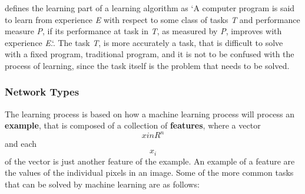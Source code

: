 \documentclass{article}
\begin{document}
\cite{mitchel97} defines the learning part of a learning algorithm as `A computer program is said to learn from experience \textit{E} with respect to some class of tasks \textit{T} and performance measure \textit{P}, if its performance at task in \textit{T}, as measured by \textit{P}, improves with experience \textit{E}.`. The task \textit{T}, is more accurately a task, that is difficult to solve with a fixed program, traditional program, and it is not to be confused with the process of learning, since the task itself is the problem that needs to be solved.

\subsubsection{Network Types}
The learning process is based on how a machine learning process will process an \textbf{example}, that is composed of a collection of \textbf{features}, where a vector \[x in R^n \] and each \[x_i\] of the vector is just another feature of the example. An example of a feature are the values of the individual pixels in an image. Some of the more common tasks that can be solved by machine learning are as follows:
\end{document}
